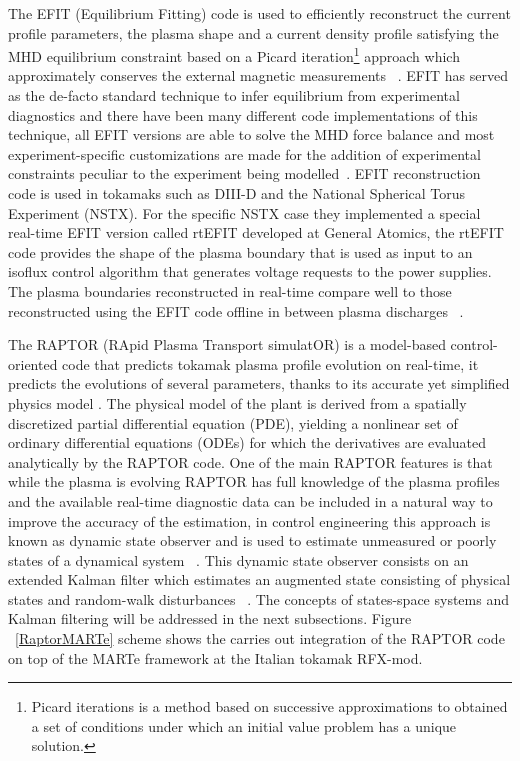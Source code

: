 The EFIT (Equilibrium Fitting) code is used to efficiently reconstruct the current profile parameters, the plasma shape  and a current density profile satisfying the MHD equilibrium constraint  based on a Picard iteration\footnote{Picard iterations is a method based on  successive approximations to obtained a set of conditions under which an initial value problem has a unique solution.} approach which approximately conserves the external magnetic measurements ~\cite{EFIT1985}. EFIT has served as the de-facto standard technique to infer equilibrium from experimental diagnostics and there have been many different code implementations of this technique, all EFIT versions  are able to solve the MHD force balance and most experiment-specific customizations are made for the addition of experimental constraints peculiar to the experiment being modelled~\cite{EFIT2013}. EFIT reconstruction code is used in tokamaks such as DIII-D and the National Spherical Torus Experiment (NSTX). For the specific NSTX case they implemented a special real-time EFIT version called rtEFIT developed at General Atomics, the rtEFIT code provides the shape of the plasma boundary that is used as input to an isoflux control algorithm that generates voltage requests to the power supplies. The plasma boundaries reconstructed in real-time compare well to those reconstructed using the EFIT code offline in between plasma discharges ~\cite{rtEFIT}.
\smallskip


The RAPTOR (RApid Plasma Transport simulatOR)  is a model-based control-oriented code that predicts tokamak plasma profile evolution on real-time, it predicts the evolutions of several parameters, thanks to its accurate yet simplified physics model \cite{Raptor}. The physical model of the plant is derived from a spatially discretized partial differential equation (PDE), yielding a nonlinear set of ordinary differential equations (ODEs) for which the derivatives are evaluated analytically by the RAPTOR code. One of the main RAPTOR features is that  while the plasma is evolving RAPTOR has full knowledge of the plasma profiles and the available real-time diagnostic data can be included in a natural way to improve the accuracy of the estimation, in control engineering this approach is known as dynamic state observer and is used to estimate unmeasured or  poorly states of a dynamical system ~\cite{RAPTOR2011}. This dynamic state observer consists on an extended Kalman filter which estimates an augmented state consisting of physical states and random-walk disturbances  ~\cite{RAPTOR2014}. The concepts of  states-space systems and Kalman filtering will be addressed in the next subsections.  Figure ~\ref{RaptorMARTe} scheme shows  the carries out  integration of the RAPTOR code on top of the MARTe framework at the Italian tokamak RFX-mod.
\smallskip

